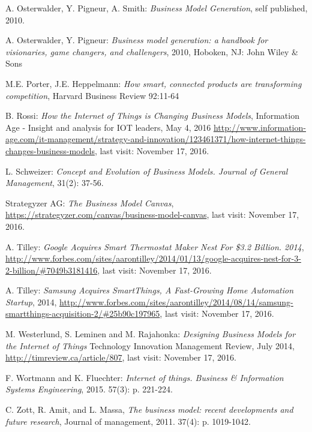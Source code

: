 \begin{thebibliography}{99}
	 A. Osterwalder, Y. Pigneur, A. Smith: \emph{Business Model Generation}, self published, 2010.


	 A. Osterwalder, Y. Pigneur:  \emph{Business model generation: a handbook for visionaries, game changers, and challengers}, 2010, Hoboken, NJ: John Wiley \& Sons

 	 M.E. Porter, J.E. Heppelmann: \emph{How smart, connected products are transforming competition}, Harvard Business Review 92:11-64
	
	 B. Rossi: \emph{How the Internet of Things is Changing Business Models}, Information Age - Insight and analysis for IOT leaders, May 4, 2016 \url{http://www.information-age.com/it-management/strategy-and-innovation/123461371/how-internet-things-changes-business-models}, last visit: November 17, 2016.

	 L. Schweizer: \emph{Concept and Evolution of Business Models. Journal of General Management},  31(2): 37-56.

	 Strategyzer AG: \emph{The Business Model Canvas}, \url{https://strategyzer.com/canvas/business-model-canvas}, last visit: November 17, 2016.

 	  A. Tilley: \emph{Google Acquires Smart Thermostat Maker Nest For \$3.2 Billion. 2014}, \url{http://www.forbes.com/sites/aarontilley/2014/01/13/google-acquires-nest-for-3-2-billion/#7049b3181416}, last visit: November 17, 2016.

 	  A. Tilley: \emph{Samsung Acquires SmartThings, A Fast-Growing Home Automation Startup}, 2014, \url{http://www.forbes.com/sites/aarontilley/2014/08/14/samsung-smartthings-acquisition-2/#25b90c197965}, last visit: November 17, 2016.

	 M. Westerlund, S. Leminen and M. Rajahonka: \emph{Designing Business Models for the Internet of Things} Technology Innovation Management Review, July 2014, \url{http://timreview.ca/article/807}, last visit: November 17, 2016.

	 F. Wortmann and K. Fluechter: \emph{Internet of things. Business \& Information Systems Engineering}, 2015. 57(3): p. 221-224.

	 C. Zott, R. Amit, and L. Massa, \emph{The business model: recent developments and future research}, Journal of management, 2011. 37(4): p. 1019-1042. 
 \end{thebibliography}



